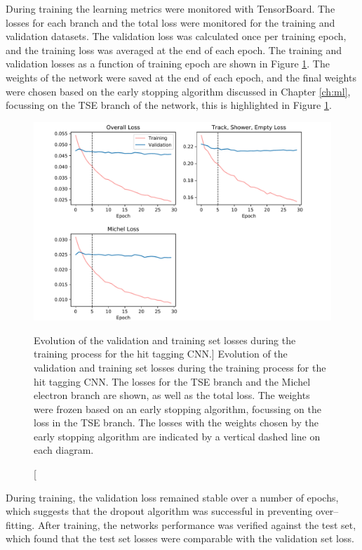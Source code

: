 During training the learning metrics were monitored with TensorBoard. The
losses for each branch and the total loss were monitored for the training
and validation datasets. The validation loss was calculated once per training
epoch, and the training loss was averaged at the end of each epoch. The 
training and validation losses as a function of training epoch are shown in 
Figure \ref{fig:training}.  The weights of the network were saved at the end 
of each epoch, and the final weights were chosen based on the early stopping 
algorithm discussed in Chapter \ref{ch:ml}, focussing on the TSE branch of the 
network, this is highlighted in Figure \ref{fig:training}.
\begin{figure}
	\centering
	\includegraphics[width=\textwidth]{figures/losses_prelu.pdf}
	\caption
	[Evolution of the validation and training set losses during the training 
	process for the hit tagging CNN.]
	{Evolution of the validation and training set losses during the training 
	process for the hit tagging CNN. The losses for the TSE branch and the Michel 
	electron branch are shown, as well as the total loss. The weights were frozen 
	based on an early stopping algorithm, focussing on the loss in the TSE 
	branch. The losses with the weights chosen by the early stopping algorithm 
	are indicated by a vertical dashed line on each diagram.} 
	\label{fig:training}
\end{figure}

During training, the validation loss remained stable over a number of epochs,
which suggests that the dropout algorithm was successful in preventing 
over--fitting. After training, the networks performance was verified against 
the test set, which found that the test set losses were comparable with the 
validation set loss. 

